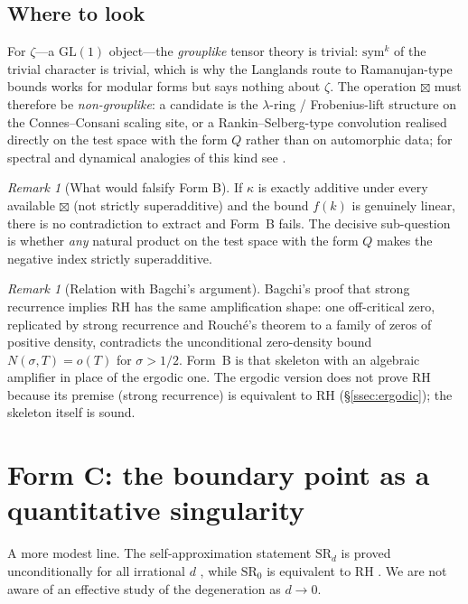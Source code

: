 \documentclass[11pt]{amsart}
\theoremstyle{definition}
\theoremstyle{remark}
\newtheorem{remark}[theorem]{Remark}
\begin{document}
\subsection{Where to look}
For $\zeta$---a $\mathrm{GL}(1)$ object---the \emph{grouplike} tensor theory
is trivial: $\mathrm{sym}^k$ of the trivial character is trivial, which is
why the Langlands route to Ramanujan-type bounds works for modular forms
but says nothing about $\zeta$. The operation $\boxtimes$ must therefore be
\emph{non-grouplike}: a candidate is the $\lambda$-ring / Frobenius-lift
structure on the Connes--Consani scaling site, or a Rankin--Selberg-type
convolution realised directly on the test space with the form $Q$ rather than on automorphic data; for spectral and dynamical analogies of this kind see \cite{bgConnes99,bgDeninger}.

\begin{remark}[What would falsify Form B]
If $\kappa$ is exactly additive under every available $\boxtimes$ (not
strictly superadditive) and the bound $f(k)$ is genuinely linear, there is
no contradiction to extract and Form~B fails. The decisive sub-question
is whether \emph{any} natural product on the test space with the form $Q$ makes the negative index
strictly superadditive.
\end{remark}

\begin{remark}[Relation with Bagchi's argument]
Bagchi's proof that strong recurrence implies RH \cite{Bagchi} has the same amplification
shape: one off-critical zero, replicated by strong recurrence and Rouch\'e's theorem to a family
of zeros of positive density, contradicts the unconditional zero-density bound
$N(\sigma,T)=o(T)$ for $\sigma>1/2$. Form~B is that skeleton with an algebraic amplifier in place
of the ergodic one. The ergodic version does not prove RH because its premise (strong
recurrence) is equivalent to RH (\S\ref{ssec:ergodic}); the skeleton itself is sound.
\end{remark}

\section{Form C: the boundary point as a quantitative singularity}\label{sec:formC}

A more modest line. The self-approximation statement $\mathrm{SR}_d$ is proved unconditionally
for all irrational $d$ \cite{Nak09,Pan10}, while $\mathrm{SR}_0$ is equivalent to RH
\cite{Bagchi}. We are not aware of an effective study of the degeneration as $d\to0$.
\end{document}
